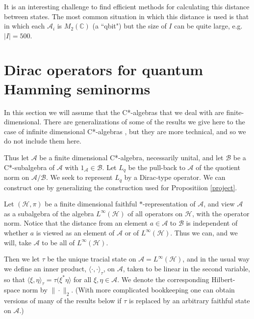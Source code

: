 \documentclass{amsart}[14pt]
\theoremstyle{definition}
\theoremstyle{remark}
\newcommand{\cA}{{\mathcal A}}
\newcommand{\cB}{{\mathcal B}}
\newcommand{\cH}{{\mathcal H}}
\newcommand{\bC}{{\mathbb C}}
\newcommand{\<}{\langle}
\renewcommand{\>}{\rangle}
\numberwithin{equation}{section}
\begin{document}
{It is an interesting challenge to find efficient methods for calculating
this distance between states. The most common situation in which 
this distance is
used is that in which each $\cA_i$ is $M_2(\bC)$ (a ``qbit") but the size
of $I$ can be quite large, e.g. $|I| = 500$.


\section{Dirac operators for quantum Hamming seminorms}
\label{dirh}

In this section we will assume that the C*-algebras that
we deal with are finite-dimensional. There are generalizations
of some of the results we give here to the case of infinite dimensional
C*-algebras \cite{R24}, but they are more technical,
and so we do not include them here. 

Thus let $\cA$ be a finite dimensional C*-algebra, necessarily 
unital, and let $ \cB$ be a C*-subalgebra of $\cA$ with
$1_\cA \in \cB$. Let $L_q$ be the pull-back to $\cA$ of
the quotient norm on $\cA/ \cB$. We seek to represent 
$L_q$ by a Dirac-type operator. We can construct one
by generalizing the construction used for Propositiion
\ref{project}.

Let $(\cH, \pi)$ be a finite dimensional faithful $*$-representation
of $\cA$, and view $\cA$ as a subalgebra of the algebra
$L^\infty(\cH)$ of all operators on $\cH$, with the operator norm. 
Notice that the distance from an element $a \in \cA$ to $\cB$
is independent of whether $a$ is viewed as an element of
$\cA$ or of $L^\infty(\cH)$. Thus we can, and we will, take 
$\cA$ to be all of $L^\infty(\cH)$.  

Then we let $\tau$ be the unique
tracial state on $\cA = L^\infty(\cH)$, and in the usual way
we define an inner product, $\<\cdot,\cdot\>_\tau$, on $\cA$,  
taken to be linear in the second variable, so that
$\<\xi, \eta\>_\tau = \tau(\xi^* \eta\>$ for all $\xi, \eta
\in \cA$. We denote the corresponding Hilbert-space
norm by $\|\cdot\|_2$.
(With more complicated bookkeeping one
can obtain versions of many of the results below if
$\tau$ is replaced by an arbitrary faithful state on $\cA$.)

}
\end{document}
